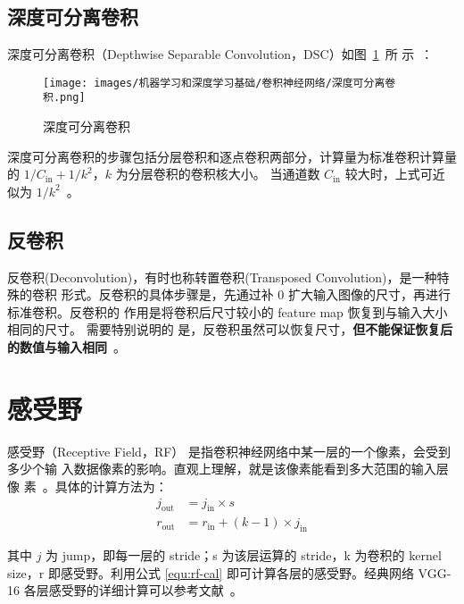 \subsection{深度可分离卷积}

深度可分离卷积（Depthwise Separable Convolution，DSC）如图~\ref{fig:ds-conv}~所
示~：

\begin{figure}[ht]
  \centering
  \texttt{[image: images/机器学习和深度学习基础/卷积神经网络/深度可分离卷积.png]}
  \caption{深度可分离卷积}
  \label{fig:ds-conv}
\end{figure}

深度可分离卷积的步骤包括分层卷积和逐点卷积两部分，计算量为标准卷积计算量的 $ 1 /
C_{\mathrm{in}} + 1/k^2 $，$k$ 为分层卷积的卷积核大小。
当通道数 $C_{\mathrm{in}}$ 较大时，上式可近似为 $1 / k^2$~。

\subsection{反卷积}
\label{subsec:deconv}

反卷积(Deconvolution)，有时也称转置卷积(Transposed Convolution)，是一种特殊的卷积
形式。反卷积的具体步骤是，先通过补 0 扩大输入图像的尺寸，再进行标准卷积。反卷积的
作用是将卷积后尺寸较小的 feature map 恢复到与输入大小相同的尺寸。 需要特别说明的
是，反卷积虽然可以恢复尺寸，\textbf{但不能保证恢复后的数值与输入相同}~。

\section{感受野}

感受野（Receptive Field，RF） 是指卷积神经网络中某一层的一个像素，会受到多少个输
入数据像素的影响。直观上理解，就是该像素能看到多大范围的输入层像
素~。具体的计算方法为：
\begin{align}
\label{equ:rf-cal}
j_{\mathrm {out}} & = j_{\mathrm{in}} \times s \\
r_{\mathrm {out}} & = r_{\mathrm{in}} + (k-1) \times j_{\mathrm{in}}
\end{align}

其中 $j$ 为 jump，即每一层的 stride；s 为该层运算的 stride，k 为卷积的 kernel
size，r 即感受野。利用公式 \eqref{equ:rf-cal} 即可计算各层的感受野。经典网络 VGG-16
各层感受野的详细计算可以参考文献~。

